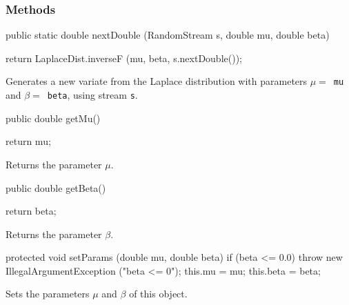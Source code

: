 \subsubsection* {Methods}
\begin{code}

   public static double nextDouble (RandomStream s, double mu, double beta)\begin{hide} {
      return LaplaceDist.inverseF (mu, beta, s.nextDouble());
   }\end{hide}
\end{code}
\begin{tabb}
   Generates a new variate from the Laplace distribution with parameters 
   $\mu = $~\texttt{mu} and $\beta = $~\texttt{beta}, using stream \texttt{s}.
\end{tabb}
\begin{code}
   
   public double getMu()\begin{hide} {
      return mu;
   }\end{hide}
\end{code}
  \begin{tabb} Returns the parameter $\mu$.
  \end{tabb}
\begin{code}

   public double getBeta()\begin{hide} {
      return beta;
   }\end{hide}
\end{code}
  \begin{tabb} Returns the parameter $\beta$.
  \end{tabb}
\begin{hide}\begin{code}

   protected void setParams (double mu, double beta) {
     if (beta <= 0.0)
         throw new IllegalArgumentException ("beta <= 0");
      this.mu = mu;
      this.beta = beta;
   }
\end{code}
\begin{tabb}
   Sets the parameters $\mu$ and $\beta$  of this object.
\end{tabb}
\begin{code}
}
\end{code}
\end{hide}
